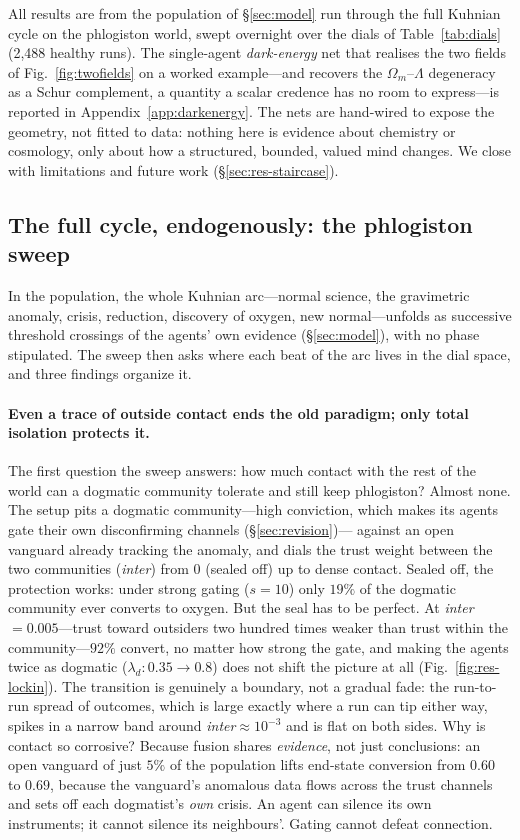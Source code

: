 \documentclass[11pt]{article}
\begin{document}
All results are from the population of \S\ref{sec:model} run through the full Kuhnian cycle on the
phlogiston world, swept overnight over the dials of Table~\ref{tab:dials} (2{,}488 healthy runs).
The single-agent \emph{dark-energy} net that realises the two fields of Fig.~\ref{fig:twofields} on
a worked example---and recovers the $\Omega_m$--$\Lambda$ degeneracy as a Schur complement, a
quantity a scalar credence has no room to express---is reported in Appendix~\ref{app:darkenergy}.
The nets are hand-wired to expose the geometry, not fitted to data: nothing here is evidence about
chemistry or cosmology, only about how a structured, bounded, valued mind changes. We close with
limitations and future work (\S\ref{sec:res-staircase}).

\subsection{The full cycle, endogenously: the phlogiston sweep}
\label{sec:res-kuhn}

In the population, the whole Kuhnian arc---normal science, the gravimetric anomaly, crisis,
reduction, discovery of oxygen, new normal---unfolds as successive threshold crossings of the agents'
own evidence (\S\ref{sec:model}), with no phase stipulated. The sweep then asks where each beat of the
arc lives in the dial space, and three findings organize it.

\paragraph{Even a trace of outside contact ends the old paradigm; only total isolation protects it.}
The first question the sweep answers: how much contact with the rest of the world can a dogmatic
community tolerate and still keep phlogiston? Almost none. The setup pits a dogmatic community---high
conviction, which makes its agents gate their own disconfirming channels (\S\ref{sec:revision})---
against an open vanguard already tracking the anomaly, and dials the trust weight between the two
communities (\emph{inter}) from $0$ (sealed off) up to dense contact. Sealed off, the protection
works: under strong gating ($s=10$) only $19\%$ of the dogmatic community ever converts to oxygen.
But the seal has to be perfect. At \emph{inter}$=0.005$---trust toward outsiders two hundred times
weaker than trust within the community---$92\%$ convert, no matter how strong the gate,
and making the agents twice as dogmatic ($\lambda_d:0.35\to0.8$) does not shift the picture at all
(Fig.~\ref{fig:res-lockin}). The transition is genuinely a boundary, not a gradual fade: the
run-to-run spread of outcomes, which is large exactly where a run can tip either way, spikes in a
narrow band around \emph{inter}$\approx10^{-3}$ and is flat on both sides. Why is contact so
corrosive? Because fusion shares \emph{evidence}, not just conclusions: an open vanguard of just
$5\%$ of the population lifts end-state conversion from $0.60$ to $0.69$, because the vanguard's
anomalous data flows across the trust channels and sets off each dogmatist's \emph{own} crisis. An
agent can silence its own instruments; it cannot silence its neighbours'. Gating cannot defeat
connection.
\end{document}
